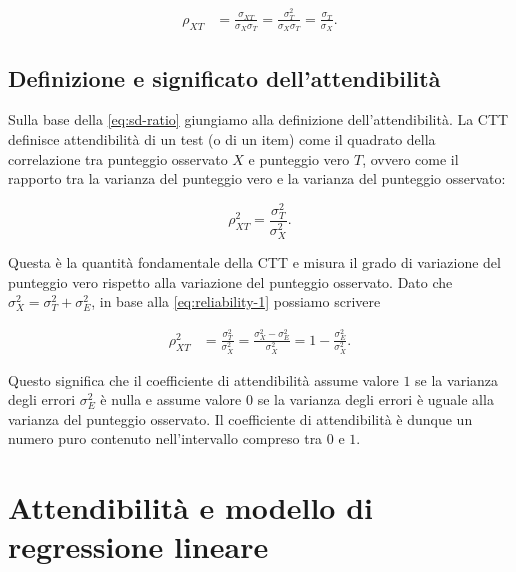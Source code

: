\documentclass[
  11pt,
]{krantz}
\theoremstyle{definition}
\theoremstyle{definition}
\theoremstyle{definition}
\theoremstyle{definition}
\theoremstyle{remark}
\begin{document}
\begin{equation}
\begin{aligned}
\rho_{XT} &= \frac{\sigma_{XT}}{\sigma_X \sigma_T} = \frac{\sigma^2_{T}}{\sigma_X \sigma_T} = \frac{\sigma_{T}}{\sigma_X}.
\label{eq:sd-ratio}
\end{aligned}
\end{equation}

\hypertarget{definizione-e-significato-dellattendibilituxe0}{%
\subsection{Definizione e significato dell'attendibilità}\label{definizione-e-significato-dellattendibilituxe0}}

Sulla base della \eqref{eq:sd-ratio} giungiamo alla definizione dell'attendibilità. La CTT definisce attendibilità di un test (o di un item) come il quadrato della correlazione tra punteggio osservato \(X\) e punteggio vero \(T\), ovvero come il rapporto tra la varianza del punteggio vero e la varianza del punteggio osservato:

\begin{equation}
\rho_{XT}^2 = \frac{\sigma_{T}^2}{\sigma_X^2}.
\label{eq:reliability-1}
\end{equation}

Questa è la quantità fondamentale della CTT e misura il grado di variazione del punteggio vero rispetto alla variazione del punteggio osservato. Dato che \(\sigma^2_X = \sigma_T^2 + \sigma_E^2\), in base alla \eqref{eq:reliability-1} possiamo scrivere

\begin{equation}
\begin{aligned}
\rho_{XT}^2 &= \frac{\sigma_{T}^2}{\sigma_X^2} =\frac{\sigma_{X}^2 - \sigma^2_E}{\sigma_X^2}
 = 1-\frac{\sigma_{E}^2}{\sigma_X^2}.
 \label{eq:3-2-6}
\end{aligned}
\end{equation}

Questo significa che il coefficiente di attendibilità assume valore \(1\) se la varianza degli errori \(\sigma_{E}^2\) è nulla e assume valore \(0\) se la varianza degli errori è uguale alla varianza del punteggio osservato. Il coefficiente di attendibilità è dunque un numero puro contenuto nell'intervallo compreso tra \(0\) e \(1\).

\hypertarget{attendibilituxe0-e-modello-di-regressione-lineare}{%
\section{Attendibilità e modello di regressione lineare}\label{attendibilituxe0-e-modello-di-regressione-lineare}}
\end{document}
